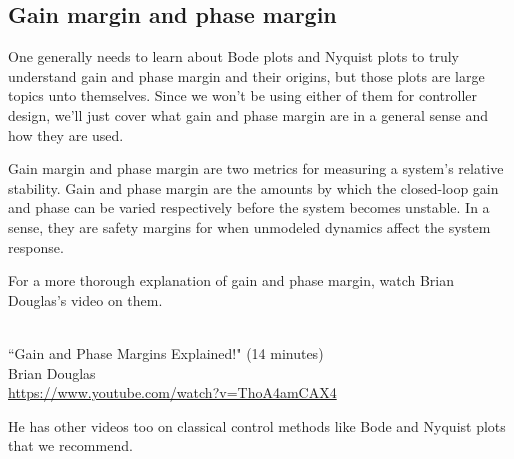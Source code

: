 \subsection{Gain margin and phase margin}
\label{subsec:gain_phase_margin}

One generally needs to learn about Bode plots and Nyquist plots to truly
understand gain and phase margin and their origins, but those plots are large
topics unto themselves. Since we won't be using either of them for controller
design, we'll just cover what gain and phase margin are in a general sense and
how they are used.

Gain margin and phase margin are two metrics for measuring a \gls{system}'s
relative stability. Gain and phase margin are the amounts by which the
closed-loop gain and phase can be varied respectively before the \gls{system}
becomes unstable. In a sense, they are safety margins for when unmodeled
dynamics affect the \gls{system response}.

For a more thorough explanation of gain and phase margin, watch Brian Douglas's
video on them.
\begin{bookfigure}
   \\
  ``Gain and Phase Margins Explained!" (14 minutes) \\
  \footnotesize Brian Douglas \\
  \url{https://www.youtube.com/watch?v=ThoA4amCAX4}
\end{bookfigure}

He has other videos too on classical control methods like Bode and Nyquist plots
that we recommend.
